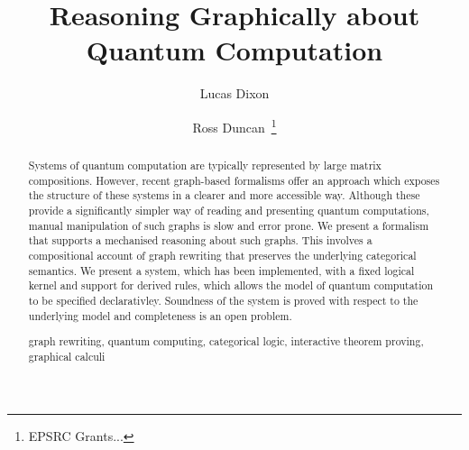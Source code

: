 \documentclass[runningheads]{llncs}
\newcommand{\keywords}[1]{\par\addvspace\baselineskip
\noindent\keywordname\enspace\ignorespaces#1}
\begin{document}
\mainmatter  %

\title{Reasoning Graphically about Quantum Computation}


%
%
\author{Lucas Dixon \and Ross Duncan~\thanks{EPSRC Grants...}%
}
%


%
%
\maketitle


\begin{abstract}
  Systems of quantum computation are typically represented by large
  matrix compositions. However, recent graph-based formalisms offer an
  approach which exposes the structure of these systems in a clearer
  and more accessible way. Although these provide a significantly
  simpler way of reading and presenting quantum computations, manual
  manipulation of such graphs is slow and error prone. We present a
  formalism that supports a mechanised reasoning about such
  graphs. This involves a compositional account of graph rewriting
  that preserves the underlying categorical semantics. We present a
  system, which has been implemented, with a fixed logical kernel and
  support for derived rules, which allows the model of quantum
  computation to be specified declarativley.  Soundness of the system
  is proved with respect to the underlying model and completeness is
  an open problem.

  \keywords{graph rewriting, quantum computing, categorical
    logic, interactive theorem proving, graphical calculi}
\end{abstract}
\end{document}
